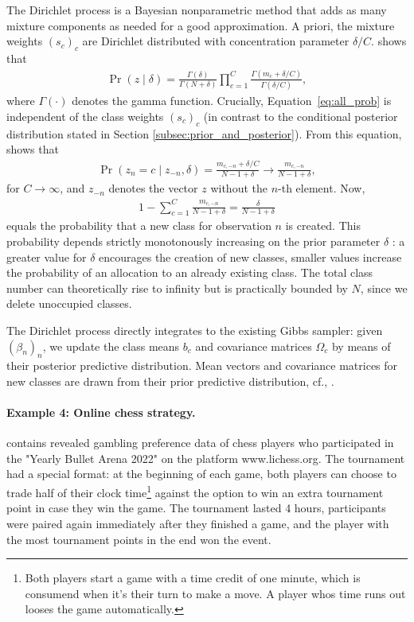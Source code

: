 \documentclass[article,shortnames]{jss}
\begin{document}
The Dirichlet process is a Bayesian nonparametric method that adds as many mixture components as needed for a good approximation. A priori, the mixture weights $(s_c)_c$ are Dirichlet distributed with concentration parameter $\delta/C$. \cite{Rasmussen:2000} shows that
%
\begin{align}
  \label{eq:all_prob}
  \Pr(z \mid \delta) = \frac{\Gamma(\delta)}{\Gamma(N+\delta)} \prod_{c=1}^C \frac{\Gamma(m_c + \delta/C)}{\Gamma(\delta/C)},
\end{align}
%
where $\Gamma(\cdot)$ denotes the gamma function. Crucially, Equation~\ref{eq:all_prob} is independent of the class weights $(s_c)_c$ (in contrast to the conditional posterior distribution stated in Section \ref{subsec:prior_and_posterior}). From this equation, \cite{Li:2019} shows that
%
\begin{align*}
  \Pr(z_n = c \mid z_{-n}, \delta) = \frac{m_{c,-n} + \delta/C}{N-1+\delta} \to \frac{m_{c,-n}}{N-1+\delta},
\end{align*}
%
for $C \to \infty$, and $z_{-n}$ denotes the vector $z$ without the $n$-th element. Now,
%
\begin{align*}
  1 - \sum_{c = 1}^C \frac{m_{c,-n}}{N-1+\delta} = \frac{\delta}{N-1+\delta}
\end{align*}
%
equals the probability that a new class for observation $n$ is created. This probability depends strictly monotonously increasing on the prior parameter $\delta$ \citep{Neal:2000}: a greater value for $\delta$ encourages the creation of new classes, smaller values increase the probability of an allocation to an already existing class. The total class number can theoretically rise to infinity but is practically bounded by $N$, since we delete unoccupied classes.

The Dirichlet process directly integrates to the existing Gibbs sampler: given $(\beta_n)_n$, we update the class means $b_c$ and covariance matrices $\Omega_c$ by means of their posterior predictive distribution. Mean vectors and covariance matrices for new classes are drawn from their prior predictive distribution, cf., \cite{Li:2019}.

\paragraph{Example 4: Online chess strategy.}

 contains revealed gambling preference data of chess players who participated in the "Yearly Bullet Arena 2022" on the platform www.lichess.org. The tournament had a special format: at the beginning of each game, both players can choose to trade half of their clock time\footnote{Both players start a game with a time credit of one minute, which is consumend when it's their turn to make a move. A player whos time runs out looses the game automatically.} against the option to win an extra tournament point in case they win the game. The tournament lasted 4 hours, participants were paired again immediately after they finished a game, and the player with the most tournament points in the end won the event.
\end{document}
